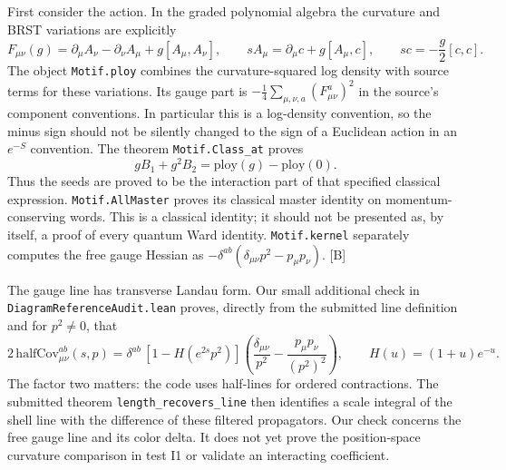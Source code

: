 \documentclass[11pt]{article}
\newcommand{\code}[1]{{\small\nolinkurl{#1}}}
\newcommand{\src}[1]{\textsf{[#1]}}
\begin{document}
First consider the action. In the graded polynomial algebra the
curvature and BRST variations are explicitly
\[
 F_{\mu\nu}(g)=\partial_\mu A_\nu-\partial_\nu A_\mu
                 +g[A_\mu,A_\nu],\qquad
 sA_\mu=\partial_\mu c+g[A_\mu,c],\qquad
 sc=-\frac g2[c,c].
\]
The object \code{Motif.ploy} combines the curvature-squared log density
with source terms for these variations. Its gauge part is
$-\frac14\sum_{\mu,\nu,a}(F^a_{\mu\nu})^2$ in the source's component
conventions. In particular this is a log-density convention, so the
minus sign should not be silently changed to the sign of a Euclidean
action in an $e^{-S}$ convention. The theorem \code{Motif.Class_at} proves
\begin{equation}\label{eq:classical-input}
 gB_1+g^2 B_2=\mathrm{ploy}(g)-\mathrm{ploy}(0).
\end{equation}
Thus the seeds are proved to be the interaction part of that specified
classical expression. \code{Motif.AllMaster} proves its classical master
identity on momentum-conserving words. This is a classical identity;
it should not be presented as, by itself, a proof of every quantum Ward
identity. \code{Motif.kernel} separately computes the free gauge Hessian
as $-\delta^{ab}(\delta_{\mu\nu}p^2-p_\mu p_\nu)$. \src{B}

The gauge line has transverse Landau form. Our small additional check
in \code{DiagramReferenceAudit.lean} proves, directly from the submitted
line definition and for $p^2\ne0$, that
\begin{equation}\label{eq:gauge-line-audit}
 2\,\mathrm{halfCov}^{ab}_{\mu\nu}(s,p)=
 \delta^{ab}\,[1-H(e^{2s}p^2)]
 \left(\frac{\delta_{\mu\nu}}{p^2}
                   -\frac{p_\mu p_\nu}{(p^2)^2}\right),
 \qquad H(u)=(1+u)e^{-u}.
\end{equation}
The factor two matters: the code uses half-lines for ordered
contractions. The submitted theorem \code{length_recovers_line}
then identifies a scale integral of the shell line with the difference
of these filtered propagators. Our check concerns the free gauge line
and its color delta. It does not yet prove the position-space curvature
comparison in test I1 or validate an interacting coefficient.
\end{document}
